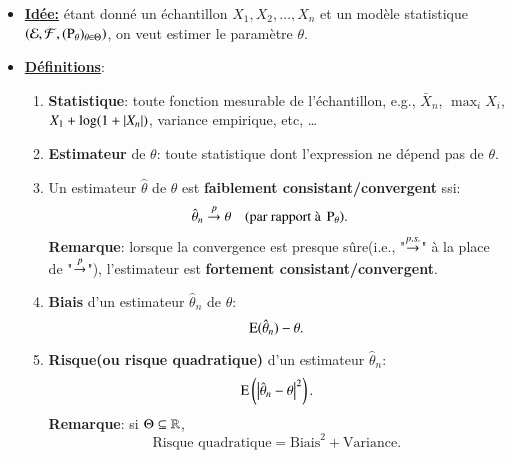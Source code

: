 \begin{frame}
    [allowframebreaks]{\sectionpage}
    \begin{itemize}
        \item \textbf{\underline{Idée:}} étant donné un échantillon $X_1, X_2, \ldots, X_n$ et 
        un modèle statistique $\left(\mathcal{E}, \mathcal{F}, (\operatorname{P}_\theta)_{\theta\in\Theta}\right)$, 
        on veut estimer le paramètre $\theta$.
        \item \textbf{\underline{Définitions}}:\begin{enumerate}[-]
            \item \textbf{Statistique}: toute fonction mesurable de l'échantillon, e.g., $\bar{X}_n$, $\max_i X_i$, 
            $X_1 + \log(1+\left\vert {X_n} \right\vert)$, variance empirique, etc, \ldots
            \item \textbf{Estimateur} de $\theta$: toute statistique dont l'expression ne dépend pas de $\theta$.
            \item Un estimateur $\hat{\theta}$ de $\theta$ est \textbf{faiblement consistant/convergent} ssi: 
            \begin{align*}
                \hat{\theta}_n & \overset{p}{\rightarrow} \theta \quad (\textrm{par rapport à} \ \operatorname{P}_\theta).
            \end{align*}
            \textbf{Remarque}: lorsque la convergence est presque sûre(i.e., "$\overset{p.s.}{\rightarrow}$" à la place de 
            "$\overset{p}{\rightarrow}$"), l'estimateur est \textbf{fortement consistant/convergent}.
            \framebreak
            \item \textbf{Biais} d'un estimateur $\hat{\theta}_n$ de $\theta$: 
            \[
                \operatorname{E}(\hat{\theta}_n) - \theta.
                \]
            \item \textbf{Risque(ou risque quadratique)} d'un estimateur $\hat{\theta}_n$:
            \[
                \operatorname{E}\left(\left\vert {\hat{\theta}_n - \theta} \right\vert^2\right).
                \] 
                \textbf{Remarque}: si $\Theta \subseteq \mathbb{R}$, 
                \[ 
                    \textrm{Risque quadratique} = \textrm{Biais}^2 + \textrm{Variance}.
                    \]
        \end{enumerate}

    \end{itemize}
\end{frame}

